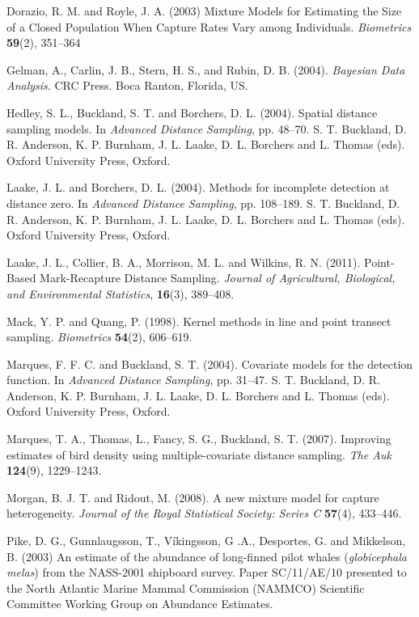 \documentclass[useAMS,referee]{biom}
\begin{document}
\begin{thebibliography}{}
\bibitem{ } Dorazio, R. M. and Royle, J. A. (2003) Mixture Models for Estimating the Size of a Closed Population When Capture Rates Vary among Individuals. \textit{Biometrics} \textbf{59}(2), 351--364 

\bibitem{ }  Gelman, A., Carlin, J. B., Stern, H. S., and Rubin, D. B. (2004). \textit{Bayesian Data Analysis}. CRC Press. Boca Ranton, Florida, US.

\bibitem{ } Hedley, S. L., Buckland, S. T. and Borchers, D. L. (2004). Spatial distance sampling models. In \textit{Advanced Distance Sampling}, pp. 48--70. S. T. Buckland, D. R. Anderson, K. P. Burnham, J. L. Laake, D. L. Borchers and L. Thomas (eds). Oxford University Press, Oxford.

\bibitem{ } Laake, J. L. and Borchers, D. L. (2004). Methods for incomplete detection at distance zero. In \textit{Advanced Distance Sampling}, pp. 108--189. S. T. Buckland, D. R. Anderson, K. P. Burnham, J. L. Laake, D. L. Borchers and L. Thomas (eds). Oxford University Press, Oxford.

\bibitem{ } Laake, J. L., Collier, B. A., Morrison, M. L. and Wilkins, R. N. (2011). Point-Based Mark-Recapture Distance Sampling. \textit{Journal of Agricultural, Biological, and Environmental Statistics}, \textbf{16}(3), 389--408.

\bibitem{ } Mack, Y. P. and Quang, P. (1998). Kernel methods in line and point transect sampling. \textit{Biometrics} \textbf{54}(2), 606--619. 

\bibitem{ } Marques, F. F. C. and Buckland, S. T. (2004). Covariate models for the detection function. In \textit{Advanced Distance Sampling}, pp. 31--47. S. T. Buckland, D. R. Anderson, K. P. Burnham, J. L. Laake, D. L. Borchers and L. Thomas (eds). Oxford University Press, Oxford.

\bibitem{ } Marques, T. A., Thomas, L., Fancy, S. G., Buckland, S. T. (2007). Improving estimates of bird density using multiple-covariate distance sampling. \textit{The Auk} \textbf{124}(9), 1229--1243.

\bibitem{ } Morgan, B. J. T. and Ridout, M. (2008). A new mixture model for capture heterogeneity. \textit{Journal of the Royal Statistical Society: Series C} \textbf{57}(4), 433--446. 

\bibitem{ } Pike, D. G., Gunnlaugsson, T., V\'{i}kingsson, G .A., Desportes, G. and Mikkelson, B.  (2003) An estimate of the abundance of long-finned pilot whales (\textit{globicephala melas}) from the NASS-2001 shipboard survey. Paper SC/11/AE/10 presented to the North Atlantic Marine Mammal Commission (NAMMCO) Scientific Committee Working Group on Abundance Estimates.


\end{thebibliography}
\end{document}
